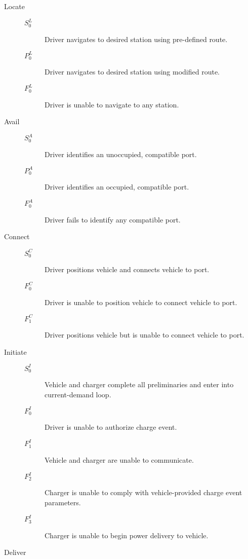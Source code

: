 \documentclass[11pt]{article}
\begin{document}
\begin{description}
	\item[Locate] \begin{description}
		\item[]
		\item[$S^L_0$] Driver navigates to desired station using pre-defined route.
		\item[$P^L_0$] Driver navigates to desired station using modified route.
		\item[$F^L_0$] Driver is unable to navigate to any station.
	\end{description}
	\item[Avail] \begin{description}
		\item[]
		\item[$S^A_0$] Driver identifies an unoccupied, compatible port.
		\item[$P^A_0$] Driver identifies an occupied, compatible port.
		\item[$F^A_0$] Driver fails to identify any compatible port.
	\end{description}
	\item[Connect] \begin{description}
		\item[]
		\item[$S^C_0$] Driver positions vehicle and connects vehicle to port.
		\item[$F^C_0$] Driver is unable to position vehicle to connect vehicle to port.
		\item[$F^C_1$] Driver positions vehicle but is unable to connect vehicle to port.
	\end{description}
	\item[Initiate] \begin{description}
		\item[]
		\item[$S^I_0$] Vehicle and charger complete all preliminaries and enter into current-demand loop.
		\item[$F^I_0$] Driver is unable to authorize charge event.
		\item[$F^I_1$] Vehicle and charger are unable to communicate.
		\item[$F^I_2$] Charger is unable to comply with vehicle-provided charge event parameters.
		\item[$F^I_3$] Charger is unable to begin power delivery to vehicle.
	\end{description}
	\item[Deliver] \begin{description}

\end{description}
\end{description}
\end{document}
